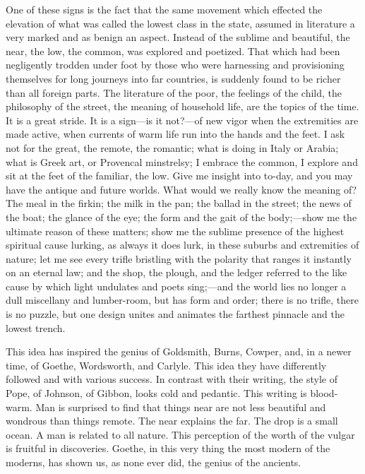 One of these signs is the fact that the same movement which effected
the elevation of what was called the lowest class in the state,
assumed in literature a very marked and as benign an aspect. Instead
of the sublime and beautiful, the near, the low, the common, was
explored and poetized. That which had been negligently trodden under
foot by those who were harnessing and provisioning themselves for long
journeys into far countries, is suddenly found to be richer 
than all foreign parts. The literature of the poor, the feelings of
the child, the philosophy of the street, the meaning of household
life, are the topics of the time. It is a great stride. It is a
sign---is it not?---of new vigor when the extremities are made active,
when currents of warm life run into the hands and the feet. I ask not
for the great, the remote, the romantic; what is doing in Italy or
Arabia; what is Greek art, or Provencal minstrelsy; I embrace the
common, I explore and sit at the feet of the familiar, the low. Give
me insight into to-day, and you may have the antique and future
worlds. What would we really know the meaning of? The meal in the
firkin; the milk in the pan; the ballad in the street; the news of the
boat; the glance of the eye; the form and the gait of the body;---show
me the ultimate reason of these matters; show me the sublime presence
of the highest spiritual cause lurking, as always it does lurk, in
these suburbs and extremities of nature; let me see every trifle
bristling with the polarity that ranges it instantly on an eternal
law; and the shop, the plough, and the ledger referred to the like
cause by which light undulates and poets sing;---and the world lies no
longer a dull miscellany and lumber-room,  but has form and
order; there is no trifle, there is no puzzle, but one design unites
and animates the farthest pinnacle and the lowest trench.

This idea has inspired the genius of Goldsmith, Burns, Cowper, and, in
a newer time, of Goethe, Wordsworth, and Carlyle. This idea they have
differently followed and with various success. In contrast with their
writing, the style of Pope, of Johnson, of Gibbon, looks cold and
pedantic. This writing is blood-warm. Man is surprised to find that
things near are not less beautiful and wondrous than things remote.
The near explains the far. The drop is a small ocean. A man is related
to all nature. This perception of the worth of the vulgar is fruitful
in discoveries. Goethe, in this very thing the most modern of the
moderns, has shown us, as none ever did, the genius of the ancients.

